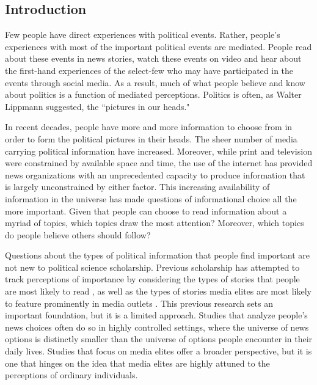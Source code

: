 \documentclass[12pt]{article}
\begin{document}
\newpage
\clearpage
\setcounter{page}{1}
\begin{doublespace}
\section{Introduction}
Few people have direct experiences with political events.  Rather, people's experiences with most of the important political events are mediated. People read about these events in news stories, watch these events on video and hear about the first-hand experiences of the select-few who may have participated in the events through social media. As a result, much of what people believe and know about politics is a function of mediated perceptions. Politics is often, as Walter Lippmann \citeyearpar{Lippmann1922} suggested, the ``pictures in our heads."

In recent decades, people have more and more information to choose from in order to form the political pictures in their heads. The sheer number of media carrying political information have increased. Moreover, while print and television were constrained by available space and time, the use of the internet has provided news organizations with an unprecedented capacity to produce information that is largely unconstrained by either factor. This increasing availability of information in the universe has made questions of informational choice all the more important. Given that people can choose to read information about a myriad of topics, which topics draw the most attention? Moreover, which topics do people believe others should follow?

Questions about the types of political information that people find important are not new to political science scholarship. Previous scholarship has attempted to track perceptions of importance by considering the types of stories that people are most likely to read \citep[e.g.,][]{LauRedlawsk2006}, as well as the types of stories media elites are most likely to feature prominently in media outlets \citep[e.g.,][]{Boydstun2014}. This previous research sets an important foundation, but it is a limited approach. Studies that analyze people's news choices often do so in highly controlled settings, where the universe of news options is distinctly smaller than the universe of options people encounter in their daily lives. Studies that focus on media elites offer a broader perspective, but it is one that hinges on the idea that media elites are highly attuned to the perceptions of ordinary individuals.


\end{doublespace}
\end{document}
